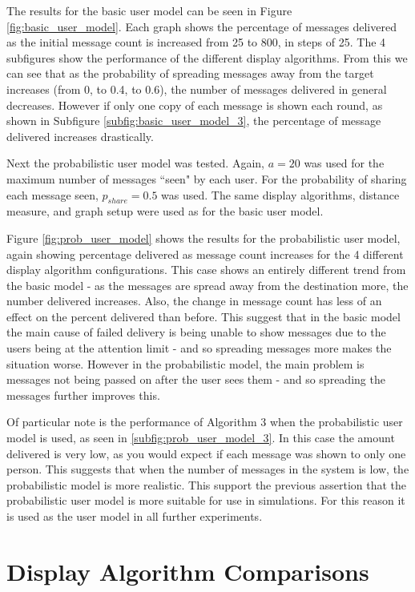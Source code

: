 \documentclass[bsc,frontabs,twoside,singlespacing,parskip,deptreport]{infthesis}     %
\begin{document}
The results for the basic user model can be seen in Figure \ref{fig:basic_user_model}. Each graph shows the percentage of messages delivered as the initial message count is increased from 25 to 800, in steps of 25. The 4 subfigures show the performance of the different display algorithms. From this we can see that as the probability of spreading messages away from the target increases (from 0, to 0.4, to 0.6), the number of messages delivered in general decreases. However if only one copy of each message is shown each round, as shown in  Subfigure \ref{subfig:basic_user_model_3}, the percentage of message delivered increases drastically.

Next the probabilistic user model was tested. Again, $a=20$ was used for the maximum number of messages ``seen" by each user. For the probability of sharing each message seen, $p_{share}=0.5$ was used. The same display algorithms, distance measure, and graph setup were used as for the basic user model.

Figure \ref{fig:prob_user_model} shows the results for the probabilistic user model, again showing percentage delivered as message count increases for the 4 different display algorithm configurations. This case shows an entirely different trend from the basic model - as the messages are spread away from the destination more, the number delivered increases. Also, the change in message count has less of an effect on the percent delivered than before. This suggest that in the basic model the main cause of failed delivery is being unable to show messages due to the users being at the attention limit - and so spreading messages more makes the situation worse. However in the probabilistic model, the main problem is messages not being passed on after the user sees them - and so spreading the messages further improves this.

Of particular note is the performance of Algorithm 3 when the probabilistic user model is used, as seen in \ref{subfig:prob_user_model_3}. In this case the amount delivered is very low, as you would expect if each message was shown to only one person. This suggests that when the number of messages in the system is low, the probabilistic model is more realistic. This support the previous assertion that the probabilistic user model is more suitable for use in simulations. For this reason it is used as the user model in all further experiments.

\section{Display Algorithm Comparisons} \label{sec:display_alg_comparisons}
\end{document}
